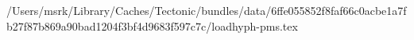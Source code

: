 /Users/msrk/Library/Caches/Tectonic/bundles/data/6ffe055852f8faf66c0acbe1a7fb27f87b869a90bad1204f3bf4d9683f597c7c/loadhyph-pms.tex